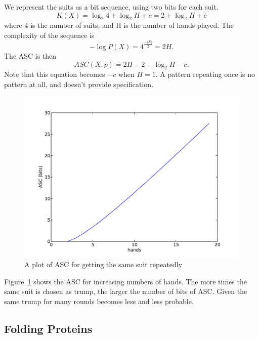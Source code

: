 We represent the suits as a bit sequence, using two bits for each suit.
\begin{equation}
    K(X) = \log_2 4 + \log_2 H + c = 2 + \log_2 H + c
\end{equation} where 4 is the number of suits, and H is the number of hands played.
The complexity of the sequence is 
\begin{equation}
    -\log P(X) = 4^\frac{-|X|}{2} = 2H \mbox{.}
\end{equation}
The ASC is then
\begin{equation}
    ASC(X,p) = 2H - 2 - \log_2 H - c \mbox{.}
\end{equation}
Note that this equation becomes $-c$ when $H=1$.
A pattern repeating once is no pattern at all, and doesn't provide specification.
\begin{figure}
    \includegraphics[width=\textwidth]{EwertRepeat}
    \caption{A plot of ASC for getting the same suit repeatedly}
    \label{suit.plot}
\end{figure}
Figure~\ref{suit.plot} shows the ASC for increasing numbers of hands.
The more times the same suit is chosen as trump, the larger the number of bits of ASC.
Given the same trump for many rounds becomes less and less probable.

\subsection{Folding Proteins}
\label{sec_folding}

